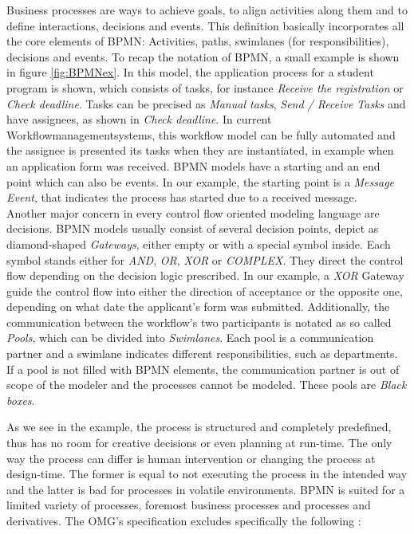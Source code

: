 Business processes are ways to achieve goals, to align activities along them and to define interactions, decisions and events. This definition basically incorporates all the core elements of BPMN: Activities, paths, swimlanes (for responsibilities), decisions and events. To recap the notation of BPMN, a small example is shown in figure \ref{fig:BPMNex}. 
In this model, the application process for a student program is shown, which consists of tasks, for instance \textit{Receive the registration} or \textit{Check deadline}. Tasks can be precised as \textit{Manual tasks}, \textit{Send / Receive Tasks} and have assignees, as shown in \textit{Check deadline}. In current Workflowmanagementsystems, this workflow model can be fully automated and the assignee is presented its tasks when they are instantiated, in example when an application form was received. BPMN models have a starting and an end point which can also be events. In our example, the starting point is a \textit{Message Event}, that indicates the process has started due to a received message. \\
Another major concern in every control flow oriented modeling language are decisions. BPMN models usually consist of several decision points, depict as diamond-shaped \textit{Gateways}, either empty or with a special symbol inside. Each symbol stands either for \textit{AND}, \textit{OR}, \textit{XOR} or \textit{COMPLEX}. They direct the control flow depending on the decision logic prescribed. In our example, a \textit{XOR} Gateway guide the control flow into either the direction of acceptance or the opposite one, depending on what date the applicant's form was submitted. Additionally, the communication between the workflow's two participants is notated as so called \textit{Pools}, which can be divided into \textit{Swimlanes}. Each pool is a communication partner and a swimlane indicates different responsibilities, such as departments. If a pool is not filled with BPMN elements, the communication partner is out of scope of the modeler and the processes cannot be modeled. These pools are \textit{Black boxes}. 

As we see in the example, the process is structured and completely predefined, thus has no room for creative decisions or even planning at run-time. The only way the process can differ is human intervention or changing the process at design-time. The former is equal to not executing the process in the intended way and the latter is bad for processes in volatile environments. BPMN is suited for a limited variety of processes, foremost business processes and processes and derivatives. The OMG's specification excludes specifically the following \cite{BPMNspec}: 

